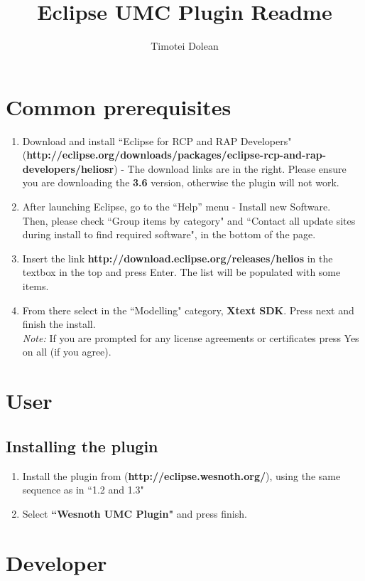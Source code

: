 \documentclass[10pt]{article}
\title{Eclipse UMC Plugin Readme}
\author{Timotei Dolean}
\begin{document}
\maketitle

\newcommand{\icnt}{ \stepcounter{cnt} \thecnt }

\section{Common prerequisites}
\begin{enumerate}
\item Download and install ``Eclipse for RCP and RAP Developers" (\textbf{http://eclipse.org/downloads/packages/eclipse-rcp-and-rap-developers/heliosr}) -
The download links are in the right. Please ensure you are downloading the \textbf{3.6} version,
otherwise the plugin will not work.
\item After launching Eclipse, go to the ``Help'' menu - Install new Software. \\
  Then, please check ``Group items by category" and ``Contact all update sites during install to find required software",
  in the bottom of the page.
\item Insert the link \textbf{http://download.eclipse.org/releases/helios} in the textbox in the top and press Enter.
  The list will be populated with some items.
\item From there select in the ``Modelling" category, \textbf{Xtext SDK}.
  Press next and finish the install.\\
  \textit{Note:} If you are prompted for any license agreements or certificates press Yes on all (if you agree).
\end{enumerate}

\section{User}
\subsection{Installing the plugin}
\begin{enumerate}
\item Install the plugin from (\textbf{http://eclipse.wesnoth.org/}), using the same sequence as in ``1.2 and 1.3"
\item Select \textbf{``Wesnoth UMC Plugin"} and press finish.
\end{enumerate}

\section{Developer}
\end{document}
